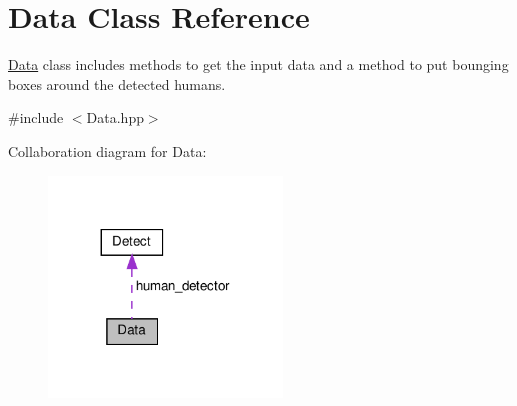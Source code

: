 \hypertarget{classData}{}\section{Data Class Reference}
\label{classData}


\hyperlink{classData}{Data} class includes methods to get the input data and a method to put bounging boxes around the detected humans.  




{\ttfamily \#include $<$Data.\+hpp$>$}



Collaboration diagram for Data\+:
\nopagebreak
\begin{figure}[H]
\begin{center}
\leavevmode
\includegraphics[width=176pt]{classData__coll__graph}
\end{center}
\end{figure}
